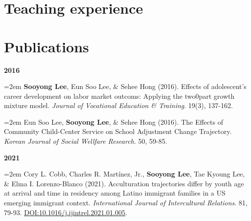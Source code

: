 \documentclass[11pt,letterpaper,]{awesome-me}
\begin{document}
\newpage

\hypertarget{teaching-experience}{%
\section{Teaching experience}\label{teaching-experience}}

\begin{cventries} 

 \end{cventries}

\vspace{-2em}

\hypertarget{publications}{%
\section{Publications}\label{publications}}

\setlength{\leftskip}{0cm}

\textbf{2016}

\hangindent=2em  \textbf{Sooyong Lee}, Eun Soo Lee, \& Sehee
Hong (2016). Effects of adolescent's career development on labor market
outcoms: Applying the two0part growth mixture model. \emph{Journal of
Vocational Education \& Training}. 19(3), 137-162.

\hangindent=2em  Eun Soo Lee, \textbf{Sooyong Lee}, \& Sehee
Hong (2016). The Effects of Community Child-Center Service on School
Adjustment Change Trajectory. \emph{Korean Journal of Social Wellfare
Research}. 50, 59-85.

\setlength{\leftskip}{0cm}

\textbf{2021}

\setlength{\leftskip}{0.5cm}

\hangindent=2em  Cory L. Cobb, Charles R. Martínez, Jr.,
\textbf{Sooyong Lee}, Tae Kyoung Lee, \& Elma I. Lorenzo-Blanco (2021).
Acculturation trajectories differ by youth age at arrival and time in
residency among Latino immigrant families in a US emerging immigrant
context. \emph{International Journal of Intercultural Relations}. 81,
79-93. \url{DOI:10.1016/j.ijintrel.2021.01.005}.
\end{document}
